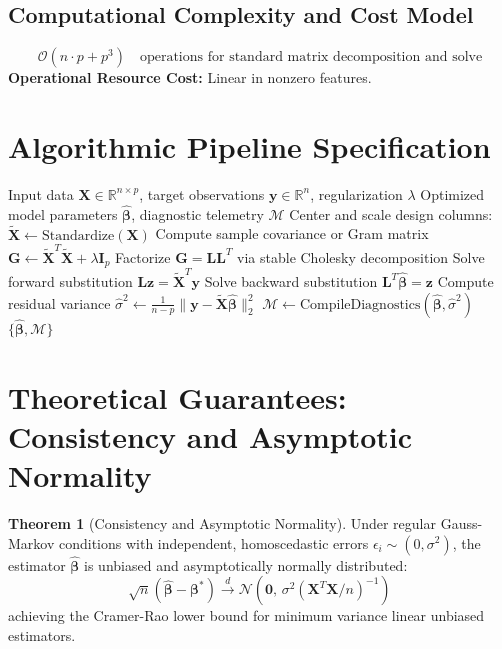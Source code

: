\documentclass[11pt,a4paper]{article}
\theoremstyle{definition}
\newtheorem{theorem}{\textbf{Theorem}}[section]
\begin{document}
\subsection{Computational Complexity and Cost Model}
\begin{equation}
\mathcal{O}(n \cdot p + p^3) \quad \text{operations for standard matrix decomposition and solve}
\end{equation}
\textbf{Operational Resource Cost:} Linear in nonzero features.

\section{Algorithmic Pipeline Specification}

\begin{algorithm}[H]
\caption{Factorization machines Execution}
\begin{algorithmic}[1]
\Require Input data $\mathbf{X} \in \mathbb{R}^{n \times p}$, target observations $\mathbf{y} \in \mathbb{R}^n$, regularization $\lambda$
\Ensure Optimized model parameters $\hat{\boldsymbol{\beta}}$, diagnostic telemetry $\mathcal{M}$
\State Center and scale design columns: $\tilde{\mathbf{X}} \gets \text{Standardize}(\mathbf{X})$
\State Compute sample covariance or Gram matrix $\mathbf{G} \gets \tilde{\mathbf{X}}^T \tilde{\mathbf{X}} + \lambda \mathbf{I}_p$
\State Factorize $\mathbf{G} = \mathbf{L} \mathbf{L}^T$ via stable Cholesky decomposition
\State Solve forward substitution $\mathbf{L} \mathbf{z} = \tilde{\mathbf{X}}^T \mathbf{y}$
\State Solve backward substitution $\mathbf{L}^T \hat{\boldsymbol{\beta}} = \mathbf{z}$
\State Compute residual variance $\hat{\sigma}^2 \gets \frac{1}{n - p} \| \mathbf{y} - \tilde{\mathbf{X}} \hat{\boldsymbol{\beta}} \|_2^2$
\State $\mathcal{M} \gets \text{CompileDiagnostics}(\hat{\boldsymbol{\beta}}, \hat{\sigma}^2)$
\State \Return $\{\hat{\boldsymbol{\beta}}, \mathcal{M}\}$
\end{algorithmic}
\end{algorithm}

\section{Theoretical Guarantees: Consistency and Asymptotic Normality}

\begin{theorem}[Consistency and Asymptotic Normality]
Under regular Gauss-Markov conditions with independent, homoscedastic errors $\epsilon_i \sim (0, \sigma^2)$, the estimator $\hat{\boldsymbol{\beta}}$ is unbiased and asymptotically normally distributed:
\begin{equation}
\sqrt{n}(\hat{\boldsymbol{\beta}} - \boldsymbol{\beta}^*) \xrightarrow{d} \mathcal{N}\left(\mathbf{0}, \, \sigma^2 (\mathbf{X}^T \mathbf{X} / n)^{-1}\right)
\end{equation}
achieving the Cramer-Rao lower bound for minimum variance linear unbiased estimators.
\end{theorem}
\end{document}
